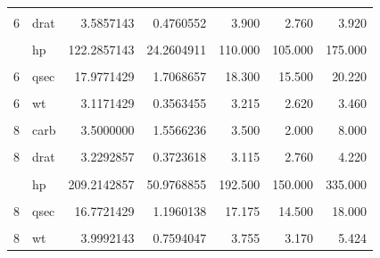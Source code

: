 \documentclass{article}
\begin{document}
\begin{table}[!h]
\begin{tabular}{rlrrrrr}
\cellcolor{gray!10}{6} & \cellcolor{gray!10}{disp} & \cellcolor{gray!10}{183.3142857} & \cellcolor{gray!10}{41.5624602} & \cellcolor{gray!10}{167.600} & \cellcolor{gray!10}{145.000} & \cellcolor{gray!10}{258.000}\\
6 & drat & 3.5857143 & 0.4760552 & 3.900 & 2.760 & 3.920\\
\cellcolor{gray!10}{6} & \cellcolor{gray!10}{gear} & \cellcolor{gray!10}{3.8571429} & \cellcolor{gray!10}{0.6900656} & \cellcolor{gray!10}{4.000} & \cellcolor{gray!10}{3.000} & \cellcolor{gray!10}{5.000}\\
\addlinespace
6 & hp & 122.2857143 & 24.2604911 & 110.000 & 105.000 & 175.000\\
\cellcolor{gray!10}{6} & \cellcolor{gray!10}{mpg} & \cellcolor{gray!10}{19.7428571} & \cellcolor{gray!10}{1.4535670} & \cellcolor{gray!10}{19.700} & \cellcolor{gray!10}{17.800} & \cellcolor{gray!10}{21.400}\\
6 & qsec & 17.9771429 & 1.7068657 & 18.300 & 15.500 & 20.220\\
\cellcolor{gray!10}{6} & \cellcolor{gray!10}{vs} & \cellcolor{gray!10}{0.5714286} & \cellcolor{gray!10}{0.5345225} & \cellcolor{gray!10}{1.000} & \cellcolor{gray!10}{0.000} & \cellcolor{gray!10}{1.000}\\
6 & wt & 3.1171429 & 0.3563455 & 3.215 & 2.620 & 3.460\\
\addlinespace
\cellcolor{gray!10}{8} & \cellcolor{gray!10}{am} & \cellcolor{gray!10}{0.1428571} & \cellcolor{gray!10}{0.3631365} & \cellcolor{gray!10}{0.000} & \cellcolor{gray!10}{0.000} & \cellcolor{gray!10}{1.000}\\
8 & carb & 3.5000000 & 1.5566236 & 3.500 & 2.000 & 8.000\\
\cellcolor{gray!10}{8} & \cellcolor{gray!10}{disp} & \cellcolor{gray!10}{353.1000000} & \cellcolor{gray!10}{67.7713236} & \cellcolor{gray!10}{350.500} & \cellcolor{gray!10}{275.800} & \cellcolor{gray!10}{472.000}\\
8 & drat & 3.2292857 & 0.3723618 & 3.115 & 2.760 & 4.220\\
\cellcolor{gray!10}{8} & \cellcolor{gray!10}{gear} & \cellcolor{gray!10}{3.2857143} & \cellcolor{gray!10}{0.7262730} & \cellcolor{gray!10}{3.000} & \cellcolor{gray!10}{3.000} & \cellcolor{gray!10}{5.000}\\
\addlinespace
8 & hp & 209.2142857 & 50.9768855 & 192.500 & 150.000 & 335.000\\
\cellcolor{gray!10}{8} & \cellcolor{gray!10}{mpg} & \cellcolor{gray!10}{15.1000000} & \cellcolor{gray!10}{2.5600481} & \cellcolor{gray!10}{15.200} & \cellcolor{gray!10}{10.400} & \cellcolor{gray!10}{19.200}\\
8 & qsec & 16.7721429 & 1.1960138 & 17.175 & 14.500 & 18.000\\
\cellcolor{gray!10}{8} & \cellcolor{gray!10}{vs} & \cellcolor{gray!10}{0.0000000} & \cellcolor{gray!10}{0.0000000} & \cellcolor{gray!10}{0.000} & \cellcolor{gray!10}{0.000} & \cellcolor{gray!10}{0.000}\\
8 & wt & 3.9992143 & 0.7594047 & 3.755 & 3.170 & 5.424\\
\bottomrule
\end{tabular}
\end{table}
\end{document}
